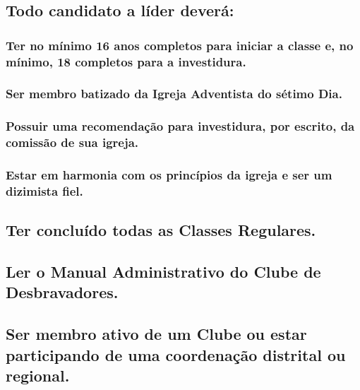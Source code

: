 

\subsection{Todo candidato a líder deverá:}

\subsubsection{Ter no mínimo 16 anos completos para iniciar a classe e, no mínimo, 18 completos para a investidura.}

\subsubsection{Ser membro batizado da Igreja Adventista do sétimo Dia.}

\subsubsection{Possuir uma recomendação para investidura, por escrito, da comissão de sua igreja.}

\subsubsection{Estar em harmonia com os princípios da igreja e ser um dizimista fiel.}

\subsection{Ter concluído todas as Classes Regulares.}

\subsection{Ler o Manual Administrativo do Clube de Desbravadores.}

\subsection{Ser membro ativo de um Clube ou estar participando de uma coordenação distrital ou regional.}